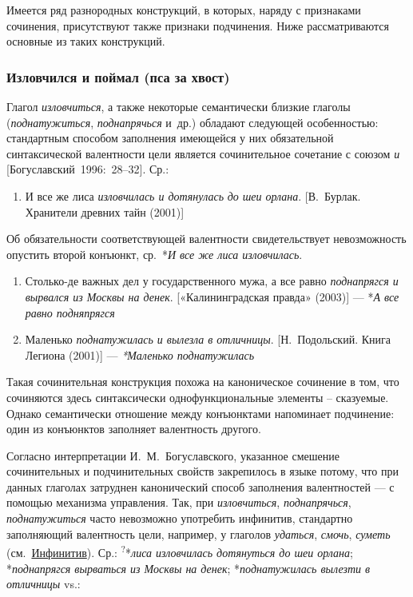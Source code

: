 Имеется ряд разнородных конструкций, в которых, наряду с признаками
сочинения, присутствуют также признаки подчинения. Ниже рассматриваются
основные из таких конструкций.

\subsubsection{Изловчился и поймал (пса за
  хвост)}\label{ux438ux437ux43bux43eux432ux447ux438ux43bux441ux44f-ux438-ux43fux43eux439ux43cux430ux43b-ux43fux441ux430-ux437ux430-ux445ux432ux43eux441ux442}

Глагол \textit{изловчиться}, а также некоторые семантически близкие
глаголы (\textit{поднатужиться}, \textit{поднапрячься} и~др.) обладают
следующей особенностью: стандартным способом заполнения имеющейся у них
обязательной синтаксической валентности цели является сочинительное
сочетание с союзом \textit{и} {[}Богуславский~1996:~28--32{]}. Ср.:

\begin{enumerate}
  \def\labelenumi{(\arabic{enumi})}
  \setcounter{enumi}{48}
  \item
        И все же лиса \textit{изловчилась и дотянулась} \textit{до шеи орлана}.
        {[}В.~Бурлак. Хранители древних тайн (2001){]}
\end{enumerate}

Об обязательности соответствующей валентности свидетельствует
невозможность опустить второй конъюнкт, ср.~*\textit{И все же лиса
  изловчилась}.

\begin{enumerate}
  \def\labelenumi{(\arabic{enumi})}
  \setcounter{enumi}{49}
  \item
        Столько-де важных дел у государственного мужа, а все равно
        \textit{поднапрягся и вырвался из Москвы на денек}. {[}«Калининградская
        правда» (2003){]} --- *\textit{А все равно подняпрягся}
  \item
        Маленько \textit{поднатужилась и вылезла в отличницы}. {[}Н.~Подольский.
        Книга Легиона (2001){]} --- \textit{*Маленько поднатужилась}
\end{enumerate}

Такая сочинительная конструкция похожа на каноническое сочинение в том,
что сочиняются здесь синтаксически однофункциональные элементы --
сказуемые. Однако семантически отношение между конъюнктами напоминает
подчинение: один из конъюнктов заполняет валентность другого.

Согласно интерпретации И.~М.~Богуславского, указанное смешение
сочинительных и подчинительных свойств закрепилось в языке потому, что
при данных глаголах затруднен канонический способ заполнения
валентностей --- с помощью механизма управления. Так, при
\textit{изловчиться}, \textit{поднапрячься}, \textit{поднатужиться} часто
невозможно употребить инфинитив, стандартно заполняющий валентность
цели, например, у глаголов \textit{удаться}, \textit{смочь}, \textit{суметь}
(см.~\underline{Инфинитив}). Ср.: \textsuperscript{?}*\textit{лиса
  изловчилась дотянуться до шеи орлана}; *\textit{поднапрягся вырваться из
  Москвы на денек}; *\textit{поднатужилась вылезти в отличницы} vs.:

